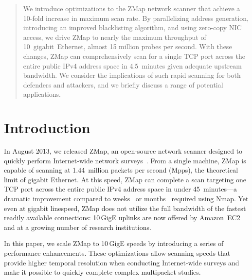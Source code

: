 \begin{abstract}
We introduce optimizations to the ZMap network scanner that achieve a 10-fold
increase in maximum scan rate. By parallelizing address generation,
introducing an improved blacklisting algorithm, and using zero-copy NIC
access, we drive ZMap to nearly the maximum throughput of
10~gigabit~Ethernet, almost 15 million probes per second. With these changes,
ZMap can comprehensively scan for a single TCP port across the entire public
IPv4 address space in 4.5~minutes given adequate upstream bandwidth. We
consider the implications of such rapid scanning for both defenders and
attackers, and we briefly discuss a range of potential
applications.
\end{abstract}

\section{Introduction}
\label{sec:introduction}

In August 2013, we released ZMap, an open-source network scanner designed to
quickly perform Internet-wide network surveys~\cite{zmap}. From a single
machine, ZMap is capable of scanning at 1.44~million packets per second
(Mpps), the theoretical limit of gigabit Ethernet. At this speed, ZMap can
complete a scan targeting one TCP port across the entire public IPv4 address
space in under 45~minutes---a dramatic improvement compared to
weeks~\cite{zmap} or months~\cite{sslobservatory} required using Nmap. Yet
even at gigabit linespeed, ZMap does not utilize the full bandwidth of the
fastest readily available connections: 10\,GigE uplinks are now offered by
Amazon~EC2~\cite{amazon-10g} and at a growing number of research
institutions. 

In this paper, we scale ZMap to 10\,GigE speeds by introducing a series of
performance enhancements. These optimizations allow scanning speeds that
provide higher temporal resolution when conducting Internet-wide surveys and
make it possible to quickly complete complex multipacket studies.

